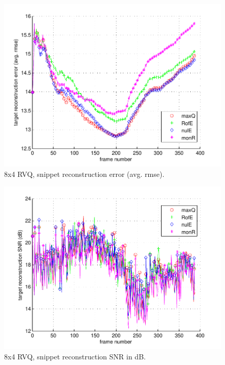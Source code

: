 								\begin{figure}[h!]
								\centering
								\includegraphics[height=0.4\textheight]{thesis/7_car11_8_4_1000_snp_armse.pdf}
								\caption{8x4 RVQ, snippet reconstruction error (avg. rmse).}
								\label{fig:7_car11_8_4_1000_snp_armse}
								\end{figure}

								\begin{figure}[h!]
								\centering
								\includegraphics[height=0.4\textheight]{thesis/7_car11_8_4_1000_snp_SNRdB.pdf}
								\caption{8x4 RVQ, snippet reconstruction SNR in dB.}
								\label{fig:7_car11_8_4_1000_snp_SNRdB}
								\end{figure}
\clearpage
\newpage
